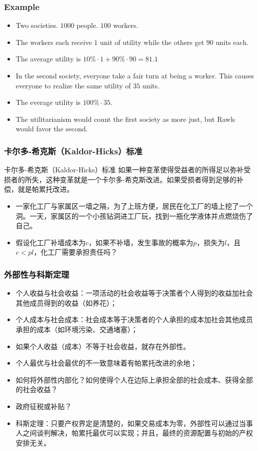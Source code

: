 \documentclass[UTF8,11pt,colorlinks,compress,openany]{beamer}%
\begin{document}
\begin{frame}\frametitle{Example}
\begin{itemize}
	\item Two societies. $1000$ people. $100$ workers.
	\item The workers each receive $1$ unit of utility while the others get $90$ units each.
	\item The average utility is $10\%\cdot 1+90\%\cdot 90=81.1$
	\item In the second society, everyone take a fair turn at being a worker. This causes everyone to realize the same utility of $35$ units.
	\item The everage utility is $100\%\cdot 35$.
	\item The utilitarianism would count the first society as more just, but Rawls would favor the second.
\end{itemize}
\end{frame}

\begin{frame}\frametitle{卡尔多-希克斯（Kaldor-Hicks）标准}
\begin{block}{卡尔多-希克斯（Kaldor-Hicks）标准}
如果一种变革使得受益者的所得足以弥补受损者的所失，这种变革就是一个卡尔多-希克斯改进。如果受损者得到足够的补偿，就是帕累托改进。
\end{block}
\begin{itemize}
	\item 一家化工厂与家属区一墙之隔，为了上班方便，居民在化工厂的墙上挖了一个洞。一天，家属区的一个小孩钻洞进工厂玩，找到一瓶化学液体并点燃烧伤了自己。
	\item 假设化工厂补墙成本为$c$，如果不补墙，发生事故的概率为$p$，损失为$l$，且$c<pl$，化工厂需要承担责任吗？
\end{itemize}
\end{frame}

\begin{frame}\frametitle{外部性与科斯定理}
\begin{itemize}
	\item 个人收益与社会收益：一项活动的社会收益等于决策者个人得到的收益加社会其他成员得到的收益（如养花）；
	\item 个人成本与社会成本：社会成本等于决策者的个人承担的成本加社会其他成员承担的成本（如环境污染、交通堵塞）；
	\item 如果个人收益（成本）不等于社会收益，就存在外部性。
	\item 个人最优与社会最优的不一致意味着有帕累托改进的余地；
	\item 如何将外部性内部化？如何使得个人在边际上承担全部的社会成本、获得全部的社会收益？
	\item 政府征税或补贴？
	\item 科斯定理：只要产权界定是清楚的，如果交易成本为零，外部性可以通过当事人之间谈判解决，帕累托最优可以实现；并且，最终的资源配置与初始的产权安排无关。
\end{itemize}
\end{frame}
\end{document}
